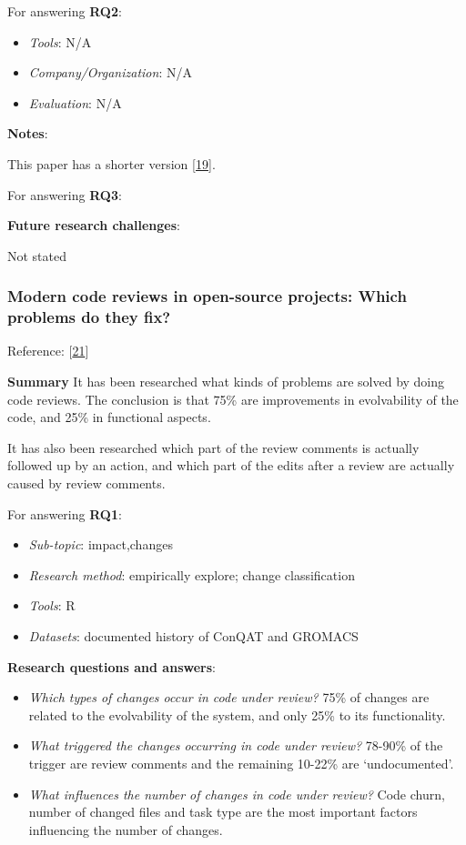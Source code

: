 \documentclass[]{book}
\providecommand{\tightlist}{%
  \setlength{\itemsep}{0pt}\setlength{\parskip}{0pt}}
\begin{document}
For answering \textbf{RQ2}:

\begin{itemize}
\tightlist
\item
  \emph{Tools}: N/A
\item
  \emph{Company/Organization}: N/A
\item
  \emph{Evaluation}: N/A
\end{itemize}

\textbf{Notes}:

This paper has a shorter version
{[}\protect\hyperlink{ref-baysal2013influence}{19}{]}.

For answering \textbf{RQ3}:

\textbf{Future research challenges}:

Not stated

\subsubsection{Modern code reviews in open-source projects: Which
problems do they
fix?}\label{modern-code-reviews-in-open-source-projects-which-problems-do-they-fix}

Reference: {[}\protect\hyperlink{ref-beller2014modern}{21}{]}

\textbf{Summary} It has been researched what kinds of problems are
solved by doing code reviews. The conclusion is that 75\% are
improvements in evolvability of the code, and 25\% in functional
aspects.

It has also been researched which part of the review comments is
actually followed up by an action, and which part of the edits after a
review are actually caused by review comments.

For answering \textbf{RQ1}:

\begin{itemize}
\tightlist
\item
  \emph{Sub-topic}: impact,changes
\item
  \emph{Research method}: empirically explore; change classification
\item
  \emph{Tools}: R
\item
  \emph{Datasets}: documented history of ConQAT and GROMACS
\end{itemize}

\textbf{Research questions and answers}:

\begin{itemize}
\tightlist
\item
  \emph{Which types of changes occur in code under review?} 75\% of
  changes are related to the evolvability of the system, and only 25\%
  to its functionality.
\item
  \emph{What triggered the changes occurring in code under review?}
  78-90\% of the trigger are review comments and the remaining 10-22\%
  are `undocumented'.
\item
  \emph{What influences the number of changes in code under review?}
  Code churn, number of changed files and task type are the most
  important factors influencing the number of changes.
\end{itemize}
\end{document}
